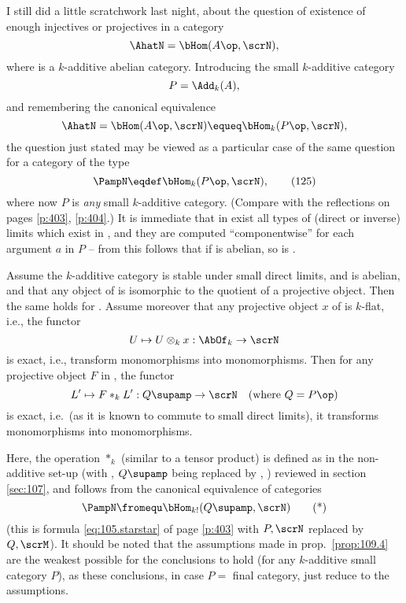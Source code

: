 \label{sec:109}%
I still did a little scratchwork last night, about the question of
existence of enough injectives or projectives in a category
\[\AhatN = \bHom(A\op,\scrN),\]
where \scrN{} is a $k$-additive abelian category. Introducing the
small $k$-additive category
\[P=\Add_k(A),\]
and remembering the canonical equivalence
\[\AhatN=\bHom(A\op,\scrN)\equeq \bHom_k(P\op,\scrN),\]
the question just stated may be viewed as a particular case of the
same question for a category of the type
\begin{equation}
  \label{eq:109.125}
  \PampN \eqdef \bHom_k(P\op,\scrN),\tag{125}
\end{equation}
where now $P$ is \emph{any} small $k$-additive category. (Compare with
the reflections on pages \ref{p:403}, \ref{p:404}.) It is immediate
that in \PampN{} exist all types of (direct or inverse) limits
which exist in \scrN, and they are computed ``componentwise'' for each
argument $a$ in $P$ -- from this follows that if \scrN{} is abelian,
so is \PampN.
\addtocounter{propositionnum}{3}
\begin{propositionnum}\label{prop:109.4}
  Assume the $k$-additive category \scrN{} is stable under small
  direct limits, and is abelian, and that any object of \scrN{} is
  isomorphic to the quotient of a projective object. Then the same
  holds for \PampN. Assume moreover that any projective object $x$ of
  \scrN{} is $k$-flat, i.e., the functor
  \[U\mapsto U\otimes_k x : \AbOf_k\to\scrN\]
  is exact, i.e., transform monomorphisms into monomorphisms. Then for
  any projective object $F$ in \PampN, the functor
  \[L'\mapsto F *_k L' : Q\supamp\to\scrN\quad (\text{where
    $Q=P\op$})\]
  is exact, i.e.\ \textup(as it is known to commute to small direct
  limits\textup), it transforms monomorphisms into monomorphisms.
\end{propositionnum}
\begin{comments}
  Here, the operation $*_k$ (similar to a tensor product) is defined
  as in the non-additive set-up (with \PampN, $Q\supamp$ being
  replaced by \AhatN, \Bhatk) reviewed in section \ref{sec:107}, and
  follows from the canonical equivalence of categories
  \begin{equation}
    \label{eq:109.star}
    \PampN \fromequ \bHom_{k!}(Q\supamp, \scrN)\tag{*}
  \end{equation}
  (this is formula \eqref{eq:105.starstar} of page
  \ref{p:403} with $P,\scrN$ replaced by $Q,\scrM$). It should be
  noted that the assumptions made in prop.\ \ref{prop:109.4} are the
  weakest possible for the conclusions to hold (for any $k$-additive
  small category $P$), as these conclusions, in case $P =$ final
  category, just reduce to the assumptions.
\end{comments}

